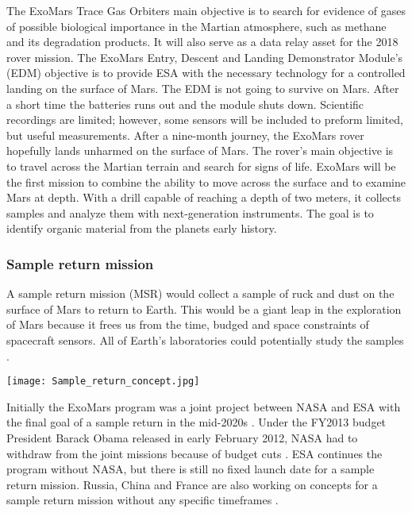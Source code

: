 The ExoMars Trace Gas Orbiters main objective is to search for evidence of gases of possible biological importance in the Martian atmosphere, such as methane and its degradation products.
It will also serve as a data relay asset for the 2018 rover mission.
The ExoMars Entry, Descent and Landing Demonstrator Module’s (EDM) objective is to provide ESA with the necessary technology for a controlled landing on the surface of Mars.
The EDM is not going to survive on Mars.
After a short time the batteries runs out and the module shuts down.
Scientific recordings are limited; however, some sensors will be included to preform limited, but useful measurements.
After a nine-month journey, the ExoMars rover hopefully lands unharmed on the surface of Mars.
The rover’s main objective is to travel across the Martian terrain and search for signs of life.
ExoMars will be the first mission to combine the ability to move across the surface and to examine Mars at depth.
With a drill capable of reaching a depth of two meters, it collects samples and analyze them with next-generation instruments.
The goal is to identify organic material from the planets early history.

\subsubsection*{Sample return mission}

A sample return mission (MSR) would collect a sample of ruck and dust on the surface of Mars to return to Earth.
This would be a giant leap in the exploration of Mars because it frees us from the time, budged and space constraints of spacecraft sensors.
All of Earth’s laboratories could potentially study the samples \cite{FPlan15}.
 
\begin{center}
	\texttt{[image: Sample\_return\_concept.jpg]}
\end{center}

Initially the ExoMars program was a joint project between NASA and ESA with the final goal of a sample return in the mid-2020s \cite{FPlan15}.
Under the FY2013 budget President Barack Obama released in early February 2012, NASA had to withdraw from the joint missions because of budget cuts \cite{FPlan16}.
ESA continues the program without NASA, but there is still no fixed launch date for a sample return mission.
Russia, China and France are also working on concepts for a sample return mission without any specific timeframes \cite{FPlan15}.

